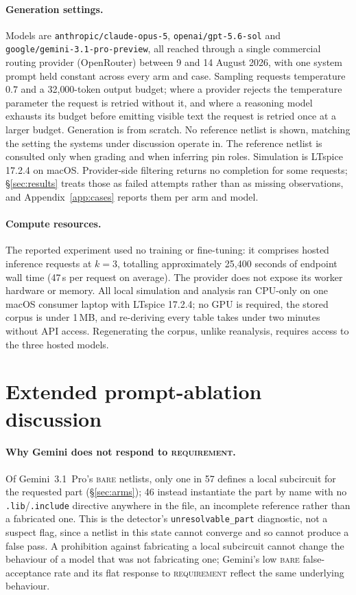 \paragraph{Generation settings.}
Models are \texttt{anthropic/claude-opus-5}, \texttt{openai/gpt-5.6-sol} and
\texttt{google/gemini-3.1-pro-preview}, all reached through a single
commercial routing provider (OpenRouter) between 9 and 14 August 2026, with
one system prompt held constant across every arm and case. Sampling requests
temperature $0.7$ and a 32{,}000-token output budget; where a provider
rejects the temperature parameter the request is retried without it, and
where a reasoning model exhausts its budget before emitting visible text the
request is retried once at a larger budget. Generation is from scratch. No
reference netlist is shown, matching the setting the systems under discussion
operate in. The reference netlist is consulted only when grading and
when inferring pin roles. Simulation is LTspice 17.2.4 on macOS. Provider-side
filtering returns no completion for some requests; \S\ref{sec:results} treats
those as failed attempts rather than as missing observations, and
Appendix~\ref{app:cases} reports them per arm and model.

\paragraph{Compute resources.}
The reported experiment used no training or fine-tuning: it comprises
\CorpusTotal{} hosted inference requests at $k=3$, totalling approximately
25{,}400 seconds of endpoint wall time (47\,s per request on average). The
provider does not expose its worker hardware or memory. All local simulation
and analysis ran CPU-only on one macOS consumer laptop with LTspice 17.2.4;
no GPU is required, the stored corpus is under 1\,MB, and re-deriving every
table takes under two minutes without API access. Regenerating the corpus,
unlike reanalysis, requires access to the three hosted models.



\section{Extended prompt-ablation discussion}
\label{app:factorial}

\paragraph{Why Gemini does not respond to \textsc{requirement}.}
Of Gemini~3.1~Pro's \textsc{bare} netlists, only one in 57 defines a local
subcircuit for the requested part (\S\ref{sec:arms}); 46 instead instantiate
the part by name with no \texttt{.lib}/\texttt{.include} directive anywhere in
the file, an incomplete reference rather than a fabricated one. This is the detector's
\texttt{unresolvable\_part} diagnostic, not a suspect flag, since a netlist in
this state cannot converge and so cannot produce a false pass. A prohibition
against fabricating a local subcircuit cannot change the behaviour of a
model that was not fabricating one; Gemini's low \textsc{bare}
false-acceptance rate and its flat response to \textsc{requirement} reflect
the same underlying behaviour.

